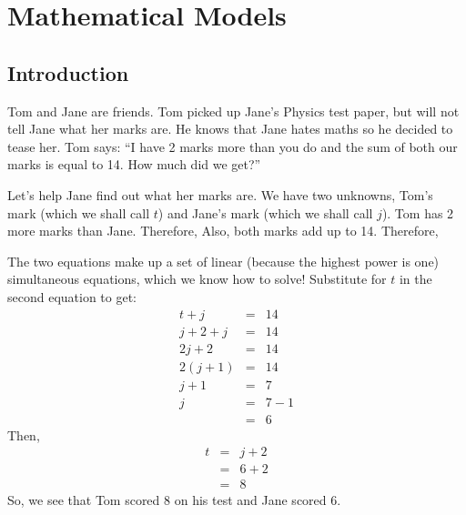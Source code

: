 \documentclass[10pt,a4paper,titlepage,twoside,openright]{report}
\begin{document}
\section{Mathematical Models}

\subsection{Introduction}
Tom and Jane are friends. Tom picked up Jane's Physics test paper, but will not tell Jane what her marks are. He knows that Jane hates maths so he decided to tease her. Tom says: ``I have 2 marks more than you do and the sum of both our marks is equal to 14. How much did we get?''

Let's help Jane find out what her marks are. We have two unknowns, Tom's mark (which we shall call $t$) and Jane's mark (which we shall call $j$). Tom has 2 more marks than Jane. Therefore,
Also, both marks add up to 14. Therefore,

The two equations make up a set of linear (because the highest power is one) simultaneous equations, which we know how to solve! Substitute for $t$ in the second equation to get:
\begin{eqnarray*}
t+j&=&14\\
j+2+j&=&14\\
2j+2&=&14\\
2(j+1)&=&14\\
j+1&=&7\\
j&=&7-1\\
&=&6
\end{eqnarray*}
Then, 
\begin{eqnarray*}
t&=&j+2\\
&=&6+2\\
&=&8
\end{eqnarray*}
So, we see that Tom scored 8 on his test and Jane scored 6.
\end{document}
